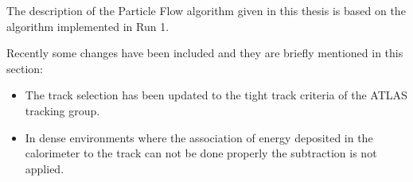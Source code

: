 The description of the Particle Flow algorithm given in this thesis is based on the algorithm implemented in Run 1.

Recently some changes have been included and they are briefly mentioned in this section:

\begin{itemize}
\item The track selection has been updated to the tight track criteria of the ATLAS tracking group.
\item In dense environments where the association of energy deposited in the calorimeter to the track can not be done properly the subtraction is not applied.

\end{itemize}



